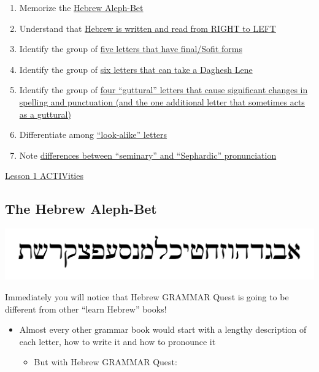 \documentclass[
]{turabian-researchpaper}
\providecommand{\tightlist}{%
  \setlength{\itemsep}{0pt}\setlength{\parskip}{0pt}}
\begin{document}
\begin{enumerate}
\def\labelenumi{\arabic{enumi}.}
\tightlist
\item
  Memorize the \protect\hyperlink{one_1}{Hebrew Aleph-Bet}
\item
  Understand that \protect\hyperlink{one_2}{Hebrew is written and read from RIGHT to LEFT}
\item
  Identify the group of \protect\hyperlink{one_3}{five letters that have final/Sofit forms}
\item
  Identify the group of \protect\hyperlink{one_4}{six letters that can take a Daghesh Lene}
\item
  Identify the group of \protect\hyperlink{one_5}{four ``guttural'' letters that cause significant changes in spelling and punctuation (and the one additional letter that sometimes acts as a guttural)}
\item
  Differentiate among \protect\hyperlink{one_6}{``look-alike'' letters}
\item
  Note \protect\hyperlink{one_7}{differences between ``seminary'' and ``Sephardic'' pronunciation}
\end{enumerate}

\protect\hyperlink{one_8}{Lesson 1 ACTIVities}

\hypertarget{one_1}{%
\subsection{The Hebrew Aleph-Bet}\label{one_1}}

\begin{center}\includegraphics[width=500pt]{images/alephbet} \end{center}

Immediately you will notice that Hebrew GRAMMAR Quest is going to be different from other ``learn Hebrew'' books!

\begin{itemize}
\tightlist
\item
  Almost every other grammar book would start with a lengthy description of each letter, how to write it and how to pronounce it

  \begin{itemize}
  \tightlist
  \item
    But with Hebrew GRAMMAR Quest:
  \end{itemize}
\end{itemize}
\end{document}
